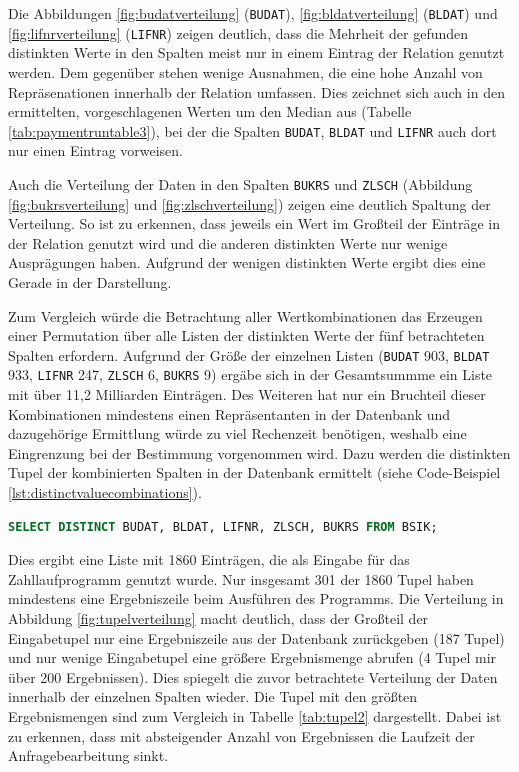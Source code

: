 Die Abbildungen \ref{fig:budatverteilung} (\texttt{BUDAT}), \ref{fig:bldatverteilung} (\texttt{BLDAT}) und \ref{fig:lifnrverteilung} (\texttt{LIFNR}) zeigen deutlich, dass die Mehrheit der gefunden distinkten Werte in den Spalten meist nur in einem Eintrag der Relation genutzt werden.
Dem gegenüber stehen wenige Ausnahmen, die eine hohe Anzahl von Repräsenationen innerhalb der Relation umfassen.
Dies zeichnet sich auch in den ermittelten, vorgeschlagenen Werten um den Median aus (Tabelle \ref{tab:paymentruntable3}), bei der die Spalten \texttt{BUDAT}, \texttt{BLDAT} und \texttt{LIFNR} auch dort nur einen Eintrag vorweisen.

Auch die Verteilung der Daten in den Spalten \texttt{BUKRS} und \texttt{ZLSCH} (Abbildung \ref{fig:bukrsverteilung} und \ref{fig:zlschverteilung}) zeigen eine deutlich Spaltung der Verteilung.
So ist zu erkennen, dass jeweils ein Wert im Großteil der Einträge in der Relation genutzt wird und die anderen distinkten Werte nur wenige Ausprägungen haben.
Aufgrund der wenigen distinkten Werte ergibt dies eine Gerade in der Darstellung.

Zum Vergleich würde die Betrachtung aller Wertkombinationen das Erzeugen einer Permutation über alle Listen der distinkten Werte der fünf betrachteten Spalten erfordern.
Aufgrund der Größe der einzelnen Listen (\texttt{BUDAT} 903, \texttt{BLDAT} 933, \texttt{LIFNR} 247, \texttt{ZLSCH} 6, \texttt{BUKRS} 9) ergäbe sich in der Gesamtsummme ein Liste mit über 11,2 Milliarden Einträgen.
Des Weiteren hat nur ein Bruchteil dieser Kombinationen mindestens einen Repräsentanten in der Datenbank und dazugehörige Ermittlung würde zu viel Rechenzeit benötigen, weshalb eine Eingrenzung bei der Bestimmung vorgenommen wird.
Dazu werden die distinkten Tupel der kombinierten Spalten in der Datenbank ermittelt (siehe Code-Beispiel \ref{lst:distinctvaluecombinations}).

\begin{lstlisting}[caption={Bestimmung der distinkten Tupel der betrachteten Spalten}, label={lst:distinctvaluecombinations}, language=SQL]
SELECT DISTINCT BUDAT, BLDAT, LIFNR, ZLSCH, BUKRS FROM BSIK;
\end{lstlisting}

Dies ergibt eine Liste mit 1860 Einträgen, die als Eingabe für das Zahllaufprogramm genutzt wurde.
Nur insgesamt 301 der 1860 Tupel haben mindestens eine Ergebniszeile beim Ausführen des Programms.
Die Verteilung in Abbildung \ref{fig:tupelverteilung} macht deutlich, dass der Großteil der Eingabetupel nur eine Ergebniszeile aus der Datenbank zurückgeben (187 Tupel) und nur wenige Eingabetupel eine größere Ergebnismenge abrufen (4 Tupel mir über 200 Ergebnissen).
Dies spiegelt die zuvor betrachtete Verteilung der Daten innerhalb der einzelnen Spalten wieder.
Die Tupel mit den größten Ergebnismengen sind zum Vergleich in Tabelle \ref{tab:tupel2} dargestellt.
Dabei ist zu erkennen, dass mit absteigender Anzahl von Ergebnissen die Laufzeit der Anfragebearbeitung sinkt.

